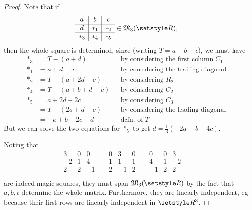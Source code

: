 \documentclass[fleqn,a4paper,11pt]{article}
\begin{document}
\begin{proof}
 Note that if
 \begin{equation*}
  \begin{array}{c|c|c}
   a & b & c \\ \hline
   d & \ast_1 & \ast_2 \\ \hline
   \ast_3 & \ast_4 & \ast_5 \\
  \end{array} \in \mathfrak M_3(\R),
 \end{equation*}
 then the whole square is determined, since (writing \(T = a + b + c\)), we must
 have
 \begin{align*}
  \ast_3 &= T - (a + d) && \text{by considering the first column \(C_1\)} \\
  \ast_1 &= a + d - c && \text{by considering the trailing diagonal} \\
  \ast_2 &= T - (a + 2d - c) && \text{by considering \(R_2\)} \\
  \ast_4 &= T - (a + b + d - c) && \text{by considering \(C_2\)} \\
  \ast_5 &= a + 2d - 2c && \text{by considering \(C_3\)} \\
         &= T - (2a + d - c) && \text{by considering the leading diagonal} \\
         &= -a + b + 2c - d && \text{defn. of \(T\)}
 \end{align*}
 But we can solve the two equations for \(\ast_5\) to get
 \(d = \tfrac 13 (-2a + b + 4c)\).

 Noting that
 \begin{equation*}
  \begin{array}{c|c|c}
   3 & 0 & 0 \\ \hline
   -2 & 1 & 4 \\ \hline
   2 & 2 & -1 \\
  \end{array}_,\quad
  \begin{array}{c|c|c}
   0 & 3 & 0 \\ \hline
   1 & 1 & 1 \\ \hline
   2 & -1 & 2 \\
  \end{array}_,\quad
  \begin{array}{c|c|c}
   0 & 0 & 3 \\ \hline
   4 & 1 & -2 \\ \hline
   -1 & 2 & 2 \\
  \end{array}_,\quad
 \end{equation*}
 are indeed magic squares, they must span \(\mathfrak M_3(\R)\) by the fact that
 \(a, b, c\) determine the whole matrix. Furthermore, they are linearly
 independent, eg because their first rows are linearly independent in \(\R^3\).
\end{proof}
\end{document}
